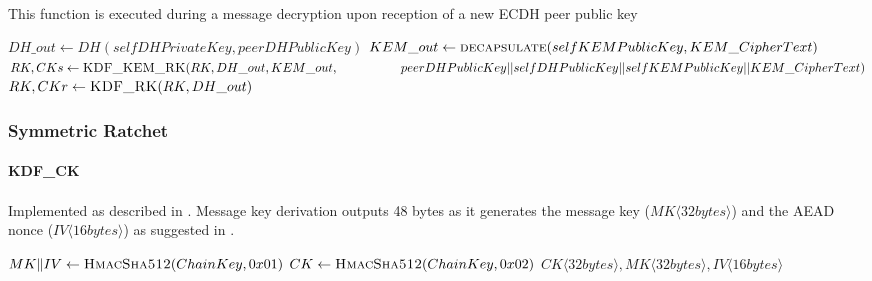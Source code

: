 \documentclass[a4paper,11pt]{article}
\begin{document}
      \paragraph*{}This function is executed during a message decryption upon reception of a new ECDH peer public key
      \begin{algorithmic}
          \Statex
          \State $DH\_out \gets DH(selfDHPrivateKey, peerDHPublicKey)$
          \Statex
             \State $KEM\_out \gets \Call{decapsulate}{selfKEMPublicKey, KEM\_CipherText}$
             \State $RK, CKs \gets \Call{KDF\_KEM\_RK}{RK, DH\_out, KEM\_out,\newline
            \hspace*{5em}peerDHPublicKey || selfDHPublicKey || selfKEMPublicKey || KEM\_CipherText}$
          \Else
             \State $RK, CKr \gets \Call{KDF\_RK}{RK, DH\_out}$
          \EndIf


        \EndFunction
      \end{algorithmic}

    \subsubsection{Symmetric Ratchet}
      \paragraph{KDF\_CK}
      \label{subsubsec:kdfck}
      \paragraph*{}Implemented as described in \cite[section 5.2]{doubleRatchet}. Message key derivation outputs 48 bytes as it generates the message key ($MK\langle 32bytes\rangle$) and the AEAD nonce ($IV\langle 16 bytes\rangle$) as suggested in \cite[section 3.1 - ENCRYPT]{doubleRatchet}.
      \begin{algorithmic}
          \State $MK\Arrowvert IV \gets \Call{HmacSha512}{ChainKey, 0x01}$
          \State $CK \gets \Call{HmacSha512}{ChainKey, 0x02}$
          \State \Return $CK\langle 32bytes\rangle ,MK\langle 32bytes\rangle ,IV\langle 16 bytes\rangle $
        \EndFunction
      \end{algorithmic}
\end{document}
